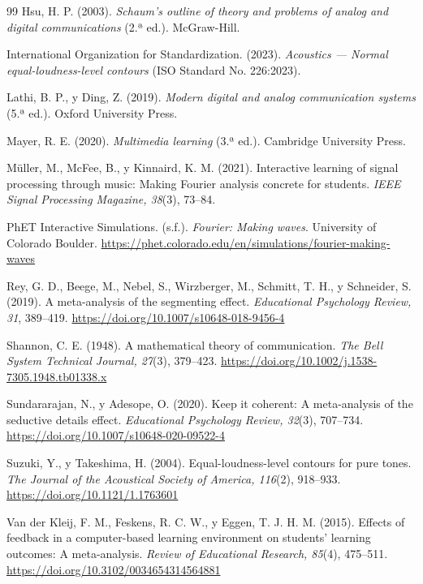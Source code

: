 \documentclass[conference]{IEEEtran}
\begin{document}
\begin{thebibliography}{99}
Hsu, H. P. (2003). \emph{Schaum's outline of theory and problems of analog and digital communications} (2.ª ed.). McGraw-Hill.

International Organization for Standardization. (2023). \emph{Acoustics --- Normal equal-loudness-level contours} (ISO Standard No. 226:2023).

Lathi, B. P., y Ding, Z. (2019). \emph{Modern digital and analog communication systems} (5.ª ed.). Oxford University Press.

Mayer, R. E. (2020). \emph{Multimedia learning} (3.ª ed.). Cambridge University Press.

Müller, M., McFee, B., y Kinnaird, K. M. (2021). Interactive learning of signal processing through music: Making Fourier analysis concrete for students. \emph{IEEE Signal Processing Magazine, 38}(3), 73--84.

PhET Interactive Simulations. (s.f.). \emph{Fourier: Making waves}. University of Colorado Boulder. \url{https://phet.colorado.edu/en/simulations/fourier-making-waves}

Rey, G. D., Beege, M., Nebel, S., Wirzberger, M., Schmitt, T. H., y Schneider, S. (2019). A meta-analysis of the segmenting effect. \emph{Educational Psychology Review, 31}, 389--419. \url{https://doi.org/10.1007/s10648-018-9456-4}

Shannon, C. E. (1948). A mathematical theory of communication. \emph{The Bell System Technical Journal, 27}(3), 379--423. \url{https://doi.org/10.1002/j.1538-7305.1948.tb01338.x}

Sundararajan, N., y Adesope, O. (2020). Keep it coherent: A meta-analysis of the seductive details effect. \emph{Educational Psychology Review, 32}(3), 707--734. \url{https://doi.org/10.1007/s10648-020-09522-4}

Suzuki, Y., y Takeshima, H. (2004). Equal-loudness-level contours for pure tones. \emph{The Journal of the Acoustical Society of America, 116}(2), 918--933. \url{https://doi.org/10.1121/1.1763601}

Van der Kleij, F. M., Feskens, R. C. W., y Eggen, T. J. H. M. (2015). Effects of feedback in a computer-based learning environment on students' learning outcomes: A meta-analysis. \emph{Review of Educational Research, 85}(4), 475--511. \url{https://doi.org/10.3102/0034654314564881}


\end{thebibliography}
\end{document}
